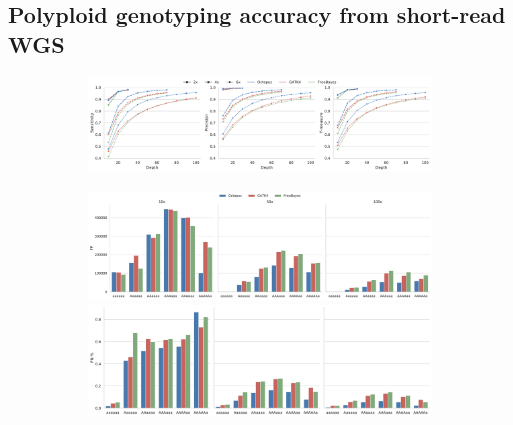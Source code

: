 \documentclass[notitlepage, twocolumn, 10pt]{article}
\begin{document}
\subsection*{Polyploid genotyping accuracy from short-read WGS}

\begin{figure}[ht!]
    \centering
\captionsetup[subfigure]{position=top,labelfont=bf,textfont=normalfont,singlelinecheck=off,justification=raggedright}
    \begin{subfigure}[b]{\textwidth}
    	\vspace{-0.8cm}
        \caption{}
        \vspace{-0.5cm}
        \includegraphics[width=\textwidth]{figures/accuracies-by-depth}
        \label{fig:synthetic:accuracy-by-depth}
    \end{subfigure}
    \begin{subfigure}[b]{0.59\textwidth}
        \vspace{-0.5cm}
        \caption{}
        \vspace{-0.5cm}
        \includegraphics[width=\textwidth]{figures/hexaploid_gt_fp_10x_50x_100x}
        \includegraphics[width=\textwidth]{figures/hexaploid_gt_fn_perc_10x_50x_100x}
        \label{fig:synthetic:gt-errors}
    \end{subfigure}

\end{figure}
\end{document}
